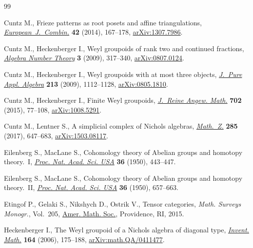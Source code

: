 \begin{thebibliography}{99}
\footnotesize\itemsep=0pt

Cuntz M., Frieze patterns as root posets and affine triangulations,
 \href{https://doi.org/10.1016/j.ejc.2014.06.005}{\textit{European~J.~Combin.}} \textbf{42} (2014), 167--178,
 \href{https://arxiv.org/abs/1307.7986}{arXiv:1307.7986}.

Cuntz M., Heckenberger I., Weyl groupoids of rank two and continued fractions,
 \href{https://doi.org/10.2140/ant.2009.3.317}{\textit{Algebra Number Theory}} \textbf{3} (2009), 317--340,
 \href{https://arxiv.org/abs/0807.0124}{arXiv:0807.0124}.

Cuntz M., Heckenberger I., Weyl groupoids with at most three objects,
 \href{https://doi.org/10.1016/j.jpaa.2008.11.009}{\textit{J.~Pure Appl. Algebra}} \textbf{213} (2009), 1112--1128,
 \href{https://arxiv.org/abs/0805.1810}{arXiv:0805.1810}.

Cuntz M., Heckenberger I., Finite {W}eyl groupoids, \href{https://doi.org/10.1515/crelle-2013-0033}{\textit{J.~Reine Angew.
 Math.}} \textbf{702} (2015), 77--108, \href{https://arxiv.org/abs/1008.5291}{arXiv:1008.5291}.

Cuntz M., Lentner S., A simplicial complex of {N}ichols algebras,
 \href{https://doi.org/10.1007/s00209-016-1711-0}{\textit{Math.~Z.}} \textbf{285} (2017), 647--683, \href{https://arxiv.org/abs/1503.08117}{arXiv:1503.08117}.

Eilenberg S., MacLane S., Cohomology theory of {A}belian groups and homotopy
 theory.~{I}, \href{https://doi.org/10.1073/pnas.36.8.443}{\textit{Proc. Nat. Acad. Sci. USA}} \textbf{36} (1950), 443--447.

Eilenberg S., MacLane S., Cohomology theory of {A}belian groups and homotopy
 theory.~{II}, \href{https://doi.org/10.1073/pnas.36.11.657}{\textit{Proc. Nat. Acad. Sci. USA}} \textbf{36} (1950),
 657--663.

Etingof P., Gelaki S., Nikshych D., Ostrik V., Tensor categories, \textit{Math.
 Surveys Monogr.}, Vol.~205, \href{https://doi.org/10.1090/surv/205}{Amer. Math. Soc.}, Providence, RI, 2015.

Heckenberger I., The {W}eyl groupoid of a {N}ichols algebra of diagonal type,
 \href{https://doi.org/10.1007/s00222-005-0474-8}{\textit{Invent. Math.}} \textbf{164} (2006), 175--188,
 \href{https://arxiv.org/abs/math.QA/0411477}{arXiv:math.QA/0411477}.


\end{thebibliography}
